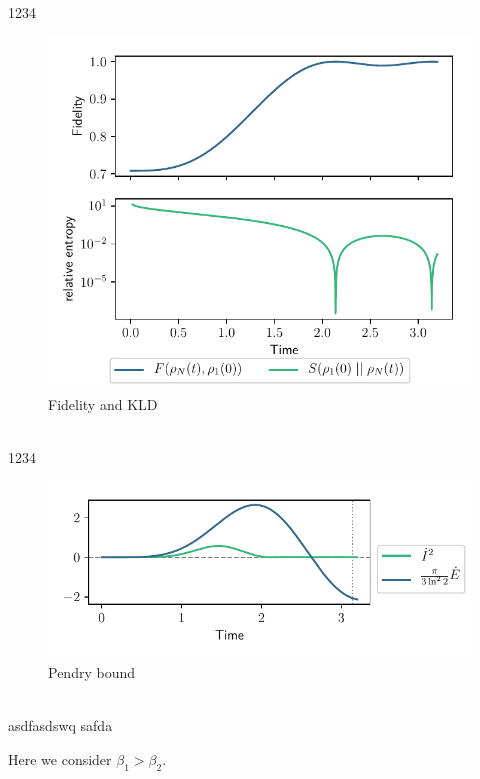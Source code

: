 \documentclass{book}
\numberwithin{equation}{section} %
\begin{document}
1234
\begin{figure}[h!]
    \centering
    \includegraphics{alltheplots/diff_beta/beta1<beta2/12_fidelity_kld.pdf}
    \caption{Fidelity and KLD}
    \label{fig:beta1_lt_beta2_corr12_fid_kld}
\end{figure}\\
1234
\begin{figure}[h!]
    \centering
    \includegraphics{alltheplots/diff_beta/beta1<beta2/12_pendry_grey_lines.pdf}
    \caption{Pendry bound \cite{BA_Pendry_1983}}
    \label{fig:beta1_lt_beta2_corr12_pendry}
\end{figure}\\
asdfasdswq
safda
\par
Here we consider $\beta_1 > \beta_2$.
\end{document}
